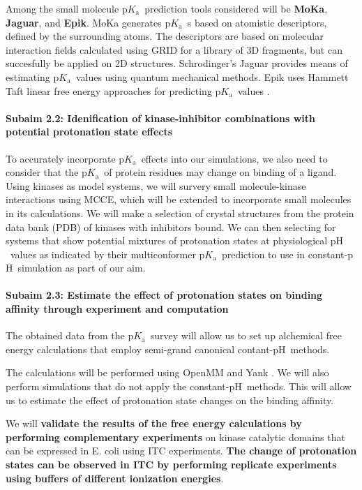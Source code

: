 \documentclass[10pt,final]{article}
\newcommand{\subsubsubsection}[1]{\paragraph*{#1}}
\newcommand{\pKa}{p$K_\mathrm{a}$\ }
\newcommand{\pH}{p$\mathrm{H}$\ }
\begin{document}
Among the small molecule \pKa prediction tools considered will be \textbf{MoKa}\cite{Milletti2007a}, \textbf{Jaguar}\cite{Bochevarov2013a}, and \textbf{Epik}\cite{Shelley2007a,Greenwood2010a}.
MoKa generates \pKa{}s based on atomistic descriptors, defined by the surrounding atoms. The descriptors are based on molecular interaction fields calculated using GRID \cite{Goodford1985a} for a library of 3D fragments, but can succesfully be applied on 2D structures.
Schrodinger's Jaguar provides means of estimating \pKa values using quantum mechanical methods.
Epik uses Hammett Taft linear free energy approaches\cite{Perrin1981a} for predicting \pKa values .

\subsubsubsection{Subaim 2.2: Idenification of kinase-inhibitor combinations with potential protonation state effects}
To accurately incorporate \pKa effects into our simulations, we also need to consider that the \pKa of protein residues may change on binding of a ligand. 
Using kinases as model systems, we will survery small molecule-kinase interactions using MCCE\cite{Song2009a}, which will be extended to incorporate small molecules in its calculations.
We will make a selection of crystal structures from the protein data bank (PDB)\cite{Berman2000a} of kinases with inhibitors bound. 
We can then selecting for systems that show potential mixtures of protonation states at physiological \pH values as indicated by their multiconformer \pKa prediction to use in constant-\pH simulation as part of our aim. 


\subsubsubsection{Subaim 2.3: Estimate the effect of protonation states on binding affinity through experiment and computation}
The obtained data from the \pKa survey will allow us to set up alchemical free energy calculations that employ semi-grand canonical contant-\pH methods.\cite{Mongan2004a}

The calculations will be performed using OpenMM\cite{Eastman2013a} and Yank \cite{Chodera2015a}. We will also perform simulations that do not apply the constant-\pH methods. This will allow us to estimate the effect of protonation state changes on the binding affinity.

We will \textbf{validate the results of the free energy calculations by performing complementary experiments} on kinase catalytic domains that can be expressed in E. coli using ITC experiments. \textbf{The change of protonation states can be observed in ITC by performing replicate experiments using buffers of different ionization energies}.
\end{document}
